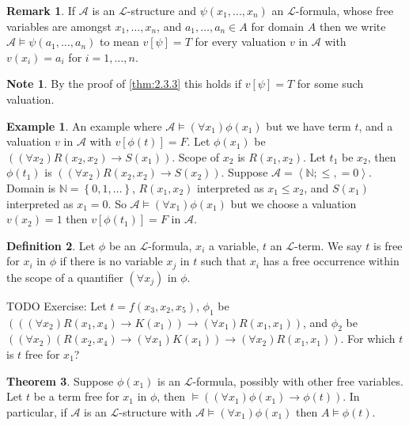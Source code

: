 \documentclass{article}
\newcommand{\N}{\mathbb{N}}
\newcommand{\rb}[1]{\left( #1 \right)}
\renewcommand{\sb}[1]{\left[ #1 \right]}
\newcommand{\cb}[1]{\left\{ #1 \right\}}
\newcommand{\ab}[1]{\left\langle #1 \right\rangle}
\newcommand{\impb}[2]{\rb{#1 \rightarrow #2}}
\newcommand{\fab}[1]{\rb{\forall #1}}
\theoremstyle{definition}\newtheorem{definition}{Definition}[subsection]
\theoremstyle{definition}\newtheorem{remark}[definition]{Remark}
\theoremstyle{definition}\newtheorem*{example}{Example}
\theoremstyle{definition}\newtheorem*{note}{Note}
\newtheorem{theorem}[definition]{Theorem}
\begin{document}

\begin{remark}
If $ \mathcal{A} $ is an $ \mathcal{L} $-structure and $ \psi\rb{x_1, \dots, x_n} $ an $ \mathcal{L} $-formula, whose free variables are amongst $ x_1, \dots, x_n $, and $ a_1, \dots, a_n \in A $ for domain $ A $ then we write $ \mathcal{A} \vDash \psi\rb{a_1, \dots, a_n} $ to mean $ v\sb{\psi} = T $ for every valuation $ v $ in $ \mathcal{A} $ with $ v\rb{x_i} = a_i $ for $ i = 1, \dots, n $.
\end{remark}

\begin{note}
By the proof of \ref{thm:2.3.3} this holds if $ v\sb{\psi} = T $ for some such valuation.
\end{note}

\begin{example}
An example where $ \mathcal{A} \vDash \fab{x_1}\phi\rb{x_1} $ but we have term $ t $, and a valuation $ v $ in $ \mathcal{A} $ with $ v\sb{\phi\rb{t}} = F $. Let $ \phi\rb{x_1} $ be $ \impb{\fab{x_2}R\rb{x_2, x_2}}{S\rb{x_1}} $. Scope of $ x_2 $ is $ R\rb{x_1, x_2} $. Let $ t_1 $ be $ x_2 $, then $ \phi\rb{t_1} $ is $ \impb{\fab{x_2}R\rb{x_2, x_2}}{S\rb{x_2}} $. Suppose $ \mathcal{A} = \ab{\N; \le, = 0} $. Domain is $ \N = \cb{0, 1, \dots} $, $ R\rb{x_1, x_2} $ interpreted as $ x_1 \le x_2 $, and $ S\rb{x_1} $ interpreted as $ x_1 = 0 $. So $ \mathcal{A} \vDash \fab{x_1}\phi\rb{x_1} $ but we choose a valuation $ v\rb{x_2} = 1 $ then $ v\sb{\phi\rb{t_1}} = F $ in $ \mathcal{A} $.
\end{example}

\begin{definition}
Let $ \phi $ be an $ \mathcal{L} $-formula, $ x_i $ a variable, $ t $ an $ \mathcal{L} $-term. We say $ t $ is free for $ x_i $ in $ \phi $ if there is no variable $ x_j $ in $ t $ such that $ x_i $ has a free occurrence within the scope of a quantifier $ \fab{x_j} $ in $ \phi $.
\end{definition}

TODO Exercise: Let $ t = f\rb{x_3, x_2, x_5} $, $ \phi_1 $ be $ \impb{\impb{\fab{x_2}R\rb{x_1, x_4}}{K\rb{x_1}}}{\fab{x_1}R\rb{x_1, x_1}} $, and $ \phi_2 $ be $ \impb{\fab{x_2}\impb{R\rb{x_2, x_4}}{\fab{x_1}K\rb{x_1}}}{\fab{x_2}R\rb{x_1, x_1}} $. For which $ t $ is $ t $ free for $ x_1 $?

\begin{theorem}
\label{thm:2.3.6}
Suppose $ \phi\rb{x_1} $ is an $ \mathcal{L} $-formula, possibly with other free variables. Let $ t $ be a term free for $ x_1 $ in $ \phi $, then $ \vDash \impb{\fab{x_1}\phi\rb{x_1}}{\phi\rb{t}} $. In particular, if $ \mathcal{A} $ is an $ \mathcal{L} $-structure with $ \mathcal{A} \vDash \fab{x_1}\phi\rb{x_1} $ then $ A \vDash \phi\rb{t} $.
\end{theorem}
\end{document}
